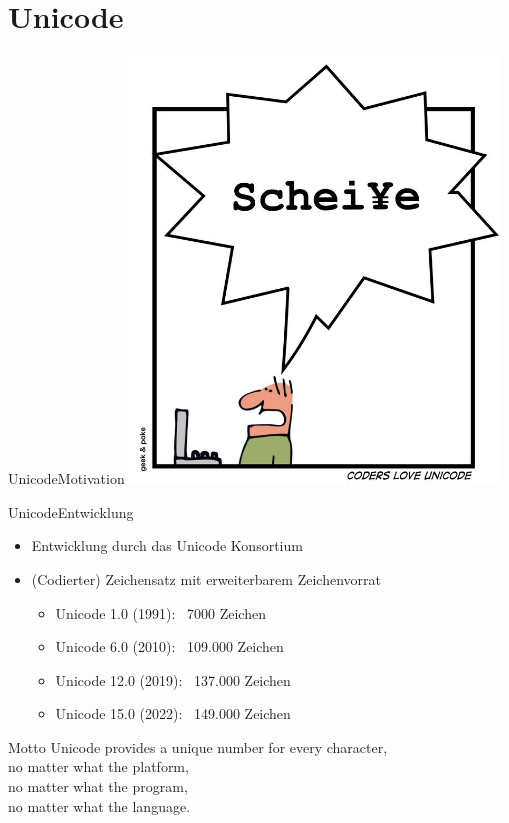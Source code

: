 \documentclass[xelatex,aspectratio=169]{beamer}
\begin{document}
\section{Unicode}

\begin{frame}{Unicode}{Motivation}
    \centering
    \includegraphics[height=.8\textheight]{img/codierung_scheisse.png}
\end{frame}

\begin{frame}{Unicode}{Entwicklung}
    \begin{itemize}
        \item Entwicklung durch das Unicode Konsortium
        \item (Codierter) Zeichensatz mit erweiterbarem Zeichenvorrat
              \begin{itemize}
                  \item Unicode 1.0 (1991): ~7000 Zeichen
                  \item Unicode 6.0 (2010): ~109.000 Zeichen
                  \item Unicode 12.0 (2019): ~137.000 Zeichen
                  \item Unicode 15.0 (2022): ~149.000 Zeichen
              \end{itemize}
    \end{itemize}
    \begin{block}{Motto}
        Unicode provides a unique number for every character, \\
        no matter what the platform, \\
        no matter what the program, \\
        no matter what the language.
    \end{block}
\end{frame}
\end{document}
